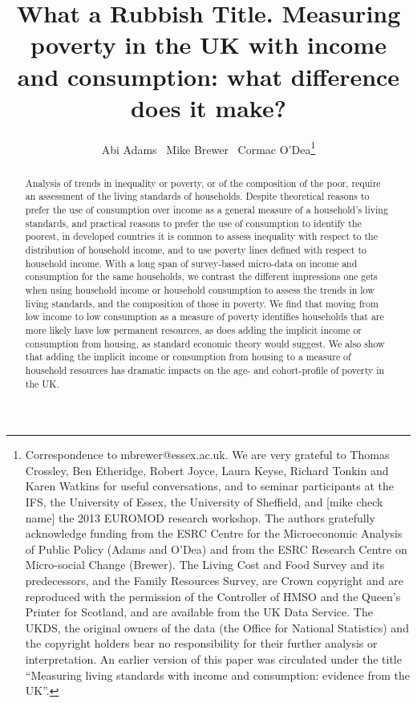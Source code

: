\documentclass[11pt]{article} %
\title{What a Rubbish Title. Measuring poverty in the UK with income and consumption: what difference does it make?}
\author{Abi Adams \ Mike Brewer \ Cormac O'Dea\thanks{
Correspondence to mbrewer@essex.ac.uk. We are very grateful to Thomas Crossley, Ben Etheridge, Robert Joyce, Laura Keyse, Richard Tonkin and Karen Watkins for useful conversations, and to seminar participants at the IFS, the University of Essex, the University of Sheffield, and [mike check name] the 2013 EUROMOD research workshop. The authors gratefully acknowledge funding from the ESRC Centre for the Microeconomic Analysis of Public Policy (Adams and O'Dea) and from the ESRC Research Centre on Micro-social Change (Brewer). The Living Cost and Food Survey and its predecessors, and the Family Resources Survey, are Crown copyright and are reproduced with the permission of the Controller of HMSO and the Queen's Printer for Scotland, and are available from the UK Data Service. The UKDS, the original owners of the data (the Office for National Statistics) and the copyright holders bear no responsibility for their further analysis or interpretation. An earlier version of this paper was circulated under the title ``Measuring living standards with income and consumption: evidence from the UK''.}
}
\begin{document}
\maketitle

\begin{abstract}
%
Analysis of trends in inequality or poverty, or of the composition of the poor, require an assessment of the living standards of households. Despite theoretical reasons to prefer the use of consumption over income as a general measure of a household's living standards, and practical reasons to prefer the use of consumption to identify the poorest, in developed countries it is common to assess inequality with respect to the distribution of household income, and to use poverty lines defined with respect to household income. With a long span of survey-based micro-data on income and consumption for the same households, we contrast the different impressions one gets when using household income or household consumption to assess the trends in low living standards, and the composition of those in poverty. We find that moving from low income to low consumption as a measure of poverty identifies households that are more likely have low permanent resources, as does adding the implicit income or consumption from housing, as standard economic theory would suggest. We also show that adding the implicit income or consumption from housing to a measure of household resources has dramatic impacts on the age- and cohort-profile of poverty in the UK.
\end{abstract}









\newpage
%


\newpage
\appendix


\end{document}
